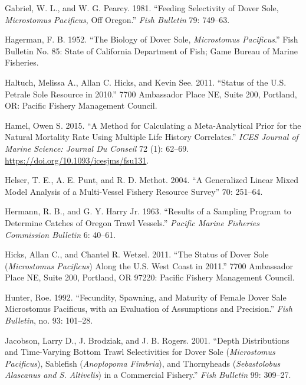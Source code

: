 \documentclass[11pt,
  english,
  a4paper,
]{article}
\begin{document}
\begin{cslreferences}
\leavevmode\hypertarget{ref-gabriel_feeding_1981}{}%
Gabriel, W. L., and W. G. Pearcy. 1981. ``Feeding Selectivity of Dover Sole, \emph{Microstomus Pacificus}, Off Oregon.'' \emph{Fish Bulletin} 79: 749--63.

\leavevmode\hypertarget{ref-hagerman_biology_1952}{}%
Hagerman, F. B. 1952. ``The Biology of Dover Sole, \emph{Microstomus Pacificus}.'' Fish Bulletin No. 85: State of California Department of Fish; Game Bureau of Marine Fisheries.

\leavevmode\hypertarget{ref-haltuch_status_2011}{}%
Haltuch, Melissa A., Allan C. Hicks, and Kevin See. 2011. ``Status of the U.S. Petrale Sole Resource in 2010.'' 7700 Ambassador Place NE, Suite 200, Portland, OR: Pacific Fishery Management Council.

\leavevmode\hypertarget{ref-hamel_method_2015}{}%
Hamel, Owen S. 2015. ``A Method for Calculating a Meta-Analytical Prior for the Natural Mortality Rate Using Multiple Life History Correlates.'' \emph{ICES Journal of Marine Science: Journal Du Conseil} 72 (1): 62--69. \url{https://doi.org/10.1093/icesjms/fsu131}.

\leavevmode\hypertarget{ref-helser_generalized_2004}{}%
Helser, T. E., A. E. Punt, and R. D. Methot. 2004. ``A Generalized Linear Mixed Model Analysis of a Multi-Vessel Fishery Resource Survey'' 70: 251--64.

\leavevmode\hypertarget{ref-hermann_results_1963}{}%
Hermann, R. B., and G. Y. Harry Jr. 1963. ``Results of a Sampling Program to Determine Catches of Oregon Trawl Vessels.'' \emph{Pacific Marine Fisheries Commission Bulletin} 6: 40--61.

\leavevmode\hypertarget{ref-hicks_status_2011}{}%
Hicks, Allan C., and Chantel R. Wetzel. 2011. ``The Status of Dover Sole (\emph{Microstomus Pacificus}) Along the U.S. West Coast in 2011.'' 7700 Ambassador Place NE, Suite 200, Portland, OR 97220: Pacific Fishery Management Council.

\leavevmode\hypertarget{ref-hunter_fecundity_1992}{}%
Hunter, Roe. 1992. ``Fecundity, Spawning, and Maturity of Female Dover Sale Microstomus Pacificus, with an Evaluation of Assumptions and Precision.'' \emph{Fish Bulletin}, no. 93: 101--28.

\leavevmode\hypertarget{ref-jacobson_depth_2001}{}%
Jacobson, Larry D., J. Brodziak, and J. B. Rogers. 2001. ``Depth Distributions and Time-Varying Bottom Trawl Selectivities for Dover Sole (\emph{Microstomus Pacificus}), Sablefish (\emph{Anoplopoma Fimbria}), and Thornyheads (\emph{Sebastolobus Alascanus and S. Altivelis}) in a Commercial Fishery.'' \emph{Fish Bulletin} 99: 309--27.


\end{cslreferences}
\end{document}
